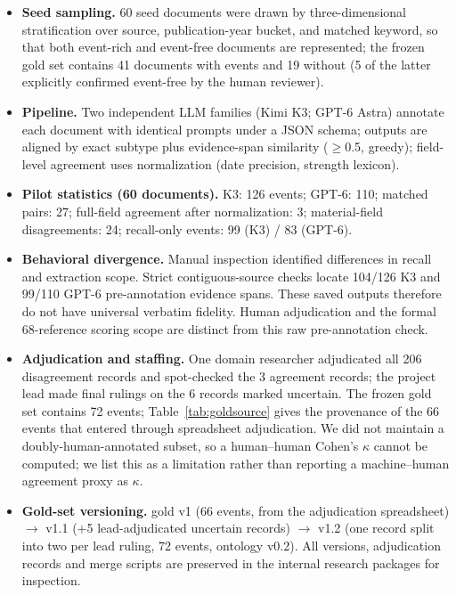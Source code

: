 \documentclass[sigconf,anonymous,review]{acmart}
\begin{document}
\begin{itemize}
  \item \textbf{Seed sampling.} 60 seed documents were drawn by three-dimensional stratification over source, publication-year bucket, and matched keyword, so that both event-rich and event-free documents are represented; the frozen gold set contains 41 documents with events and 19 without (5 of the latter explicitly confirmed event-free by the human reviewer).
  \item \textbf{Pipeline.} Two independent LLM families (Kimi K3; GPT-6 Astra) annotate each document with identical prompts under a JSON schema; outputs are aligned by exact subtype plus evidence-span similarity ($\geq$0.5, greedy); field-level agreement uses normalization (date precision, strength lexicon).
  \item \textbf{Pilot statistics (60 documents).} K3: 126 events; GPT-6: 110; matched pairs: 27; full-field agreement after normalization: 3; material-field disagreements: 24; recall-only events: 99 (K3) / 83 (GPT-6).
  \item \textbf{Behavioral divergence.} Manual inspection identified differences in recall and extraction scope. Strict contiguous-source checks locate 104/126 K3 and 99/110 GPT-6 pre-annotation evidence spans. These saved outputs therefore do not have universal verbatim fidelity. Human adjudication and the formal 68-reference scoring scope are distinct from this raw pre-annotation check.
  \item \textbf{Adjudication and staffing.} One domain researcher adjudicated all 206 disagreement records and spot-checked the 3 agreement records; the project lead made final rulings on the 6 records marked uncertain. The frozen gold set contains 72 events; Table~\ref{tab:goldsource} gives the provenance of the 66 events that entered through spreadsheet adjudication. We did not maintain a doubly-human-annotated subset, so a human--human Cohen's $\kappa$ cannot be computed; we list this as a limitation rather than reporting a machine--human agreement proxy as $\kappa$.
  \item \textbf{Gold-set versioning.} gold v1 (66 events, from the adjudication spreadsheet) $\to$ v1.1 (+5 lead-adjudicated uncertain records) $\to$ v1.2 (one record split into two per lead ruling, 72 events, ontology v0.2). All versions, adjudication records and merge scripts are preserved in the internal research packages for inspection.
\end{itemize}
\end{document}
